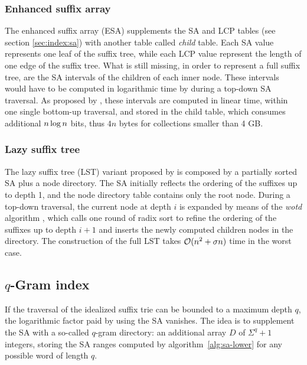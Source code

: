 \subsubsection{Enhanced suffix array}
\label{sec:index:esa}

The enhanced suffix array (ESA) \citep{Abouelhoda2004} supplements the SA and LCP tables (see section \ref{sec:index:sa}) with another table called \emph{child} table.
Each SA value represents one leaf of the suffix tree, while each LCP value represent the length of one edge of the suffix tree.
What is still missing, in order to represent a full suffix tree, are the SA intervals of the children of each inner node.
These intervals would have to be computed in logarithmic time by  during a top-down SA traversal.
As proposed by \cite{Abouelhoda2004}, these intervals are computed in linear time, within one single bottom-up traversal, and stored in the child table, which consumes additional $n \log n$ bits, thus $4n$ bytes for collections smaller than 4 GB.

\subsubsection{Lazy suffix tree}
\label{sec:index:lst}

The lazy suffix tree (LST) \citep{Giegerich1999} variant proposed by \citep{Weese2013} is composed by a partially sorted SA plus a node directory.
The SA initially reflects the ordering of the suffixes up to depth 1, and the node directory table contains only the root node.
During a top-down traversal, the current node at depth $i$ is expanded by means of the \emph{wotd} algorithm \citep{Giegerich1999}, which calls one round of radix sort to refine the ordering of the suffixes up to depth $i + 1$ and inserts the newly computed children nodes in the directory.
The construction of the full LST takes $\mathcal{O}(n^2 + \sigma n)$ time in the worst case.

\subsection{$q$-Gram index}
\label{sec:index:qgram}

If the traversal of the idealized suffix trie can be bounded to a maximum depth $q$, the logarithmic factor paid by using the SA vanishes.
The idea is to supplement the SA with a so-called $q$-gram directory: an additional array $D$ of $\Sigma^q + 1$ integers, storing the SA ranges computed by algorithm~\ref{alg:sa-lower} for any possible word of length $q$.

